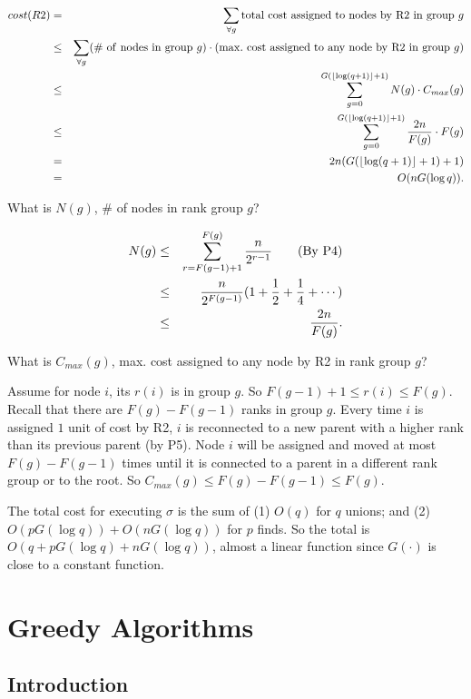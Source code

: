 \documentclass{article}
\begin{document}
\begin{itemize}
\begin{eqnarray*}
cost(R2)&=&\sum_{\forall g}{\rm total\ cost\ assigned\ to\ nodes
\ by\ R2\ in\ group\ }g\\
&\le&\sum_{\forall g}({\rm \#\ of\ nodes\ in\ group\ }g)\cdot
({\rm max.\ cost\ assigned\ to\ any\ node\ by\ R2\ in\ group\ }g)\\
&\le&\sum_{g=0}^{G(\lfloor\log(q+1)\rfloor+1)}N(g)\cdot C_{max}(g)\\
&\le&\sum_{g=0}^{G(\lfloor\log(q+1)\rfloor+1)}{2n\over F(g)}\cdot F(g)\\
&=&2n(G(\lfloor\log(q+1)\rfloor+1)+1)\\
&=&O(nG(\log q)).
\end{eqnarray*}

What is $N(g)$, \# of nodes in rank group $g$?

\begin{eqnarray*}
N(g)&\le&\sum_{r=F(g-1)+1}^{F(g)}{n\over 2^{r-1}}\qquad{\rm (By\ P4)}\\
&\le&{n\over 2^{F(g-1)}}(1+{1\over2}+{1\over4}+\cdots)\\
&\le&{2n\over F(g)}.
\end{eqnarray*}

What is $C_{max}(g)$, max. cost assigned to any node by R2 in rank group $g$?

Assume for node $i$, its $r(i)$ is in group $g$. So $F(g-1)+1\le r(i)\le F(g)$.
Recall that there are $F(g)-F(g-1)$ ranks in group $g$.
Every time $i$ is assigned $1$ unit of cost by R2, $i$ is 
reconnected to a new parent with a higher rank than its previous parent
(by P5). Node $i$ will be assigned and moved at most $F(g)-F(g-1)$
times until it is connected to a parent in a different rank group 
or to the root. So $C_{max}(g)\le F(g)-F(g-1)\le F(g)$.

The total cost for executing $\sigma$ is the sum of 
(1) $O(q)$ for $q$ unions; and
(2) $O(pG(\log q))+O(nG(\log q))$ for $p$ finds.
So the total is $O(q+pG(\log q)+nG(\log q))$, almost a linear
function since $G(\cdot)$ is close to a constant function.

\end{itemize}

\newpage

\section{Greedy Algorithms}

\subsection{Introduction}
\end{document}
